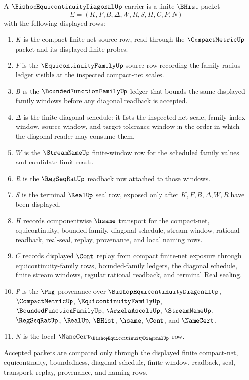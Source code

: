 \begin{definition}
\label{def:bishop-equicontinuity-diagonal-carrier}
A $\BishopEquicontinuityDiagonalUp$ carrier is a finite $\BHist$ packet
$$
E=(K,F,B,\Delta,W,R,S,H,C,P,N)
$$
with the following displayed rows:
\begin{enumerate}
\item $K$ is the compact finite-net source row, read through the $\CompactMetricUp$ packet and its displayed finite probes.
\item $F$ is the $\EquicontinuityFamilyUp$ source row recording the family-radius ledger visible at the inspected compact-net scales.
\item $B$ is the $\BoundedFunctionFamilyUp$ ledger that bounds the same displayed family windows before any diagonal readback is accepted.
\item $\Delta$ is the finite diagonal schedule: it lists the inspected net scale, family index window, source window, and target tolerance window in the order in which the diagonal reader may consume them.
\item $W$ is the $\StreamNameUp$ finite-window row for the scheduled family values and candidate limit reads.
\item $R$ is the $\RegSeqRatUp$ readback row attached to those windows.
\item $S$ is the terminal $\RealUp$ seal row, exposed only after $K,F,B,\Delta,W,R$ have been displayed.
\item $H$ records componentwise $\hsame$ transport for the compact-net, equicontinuity, bounded-family, diagonal-schedule, stream-window, rational-readback, real-seal, replay, provenance, and local naming rows.
\item $C$ records displayed $\Cont$ replay from compact finite-net exposure through equicontinuity-family rows, bounded-family ledgers, the diagonal schedule, finite stream windows, regular rational readback, and terminal Real sealing.
\item $P$ is the $\Pkg$ provenance over $\BishopEquicontinuityDiagonalUp$, $\CompactMetricUp$, $\EquicontinuityFamilyUp$, $\BoundedFunctionFamilyUp$, $\ArzelaAscoliUp$, $\StreamNameUp$, $\RegSeqRatUp$, $\RealUp$, $\BHist$, $\hsame$, $\Cont$, and $\NameCert$.
\item $N$ is the local $\NameCert_{\BishopEquicontinuityDiagonalUp}$ row.
\end{enumerate}
Accepted packets are compared only through the displayed finite compact-net, equicontinuity, boundedness, diagonal schedule, finite-window, readback, seal, transport, replay, provenance, and naming rows.
\end{definition}

